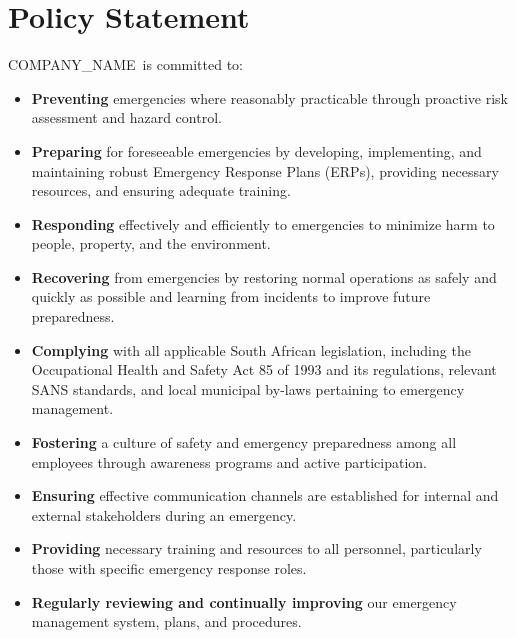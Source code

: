 \documentclass[11pt]{article}
\newcommand{\clientName}{{{COMPANY_NAME}}}
\begin{document}
\section{Policy Statement}
\clientName\ is committed to:
\begin{itemize}
    \item \textbf{Preventing} emergencies where reasonably practicable through proactive risk assessment and hazard control.
    \item \textbf{Preparing} for foreseeable emergencies by developing, implementing, and maintaining robust Emergency Response Plans (ERPs), providing necessary resources, and ensuring adequate training.
    \item \textbf{Responding} effectively and efficiently to emergencies to minimize harm to people, property, and the environment.
    \item \textbf{Recovering} from emergencies by restoring normal operations as safely and quickly as possible and learning from incidents to improve future preparedness.
    \item \textbf{Complying} with all applicable South African legislation, including the Occupational Health and Safety Act 85 of 1993 and its regulations, relevant SANS standards, and local municipal by-laws pertaining to emergency management.
    \item \textbf{Fostering} a culture of safety and emergency preparedness among all employees through awareness programs and active participation.
    \item \textbf{Ensuring} effective communication channels are established for internal and external stakeholders during an emergency.
    \item \textbf{Providing} necessary training and resources to all personnel, particularly those with specific emergency response roles.
    \item \textbf{Regularly reviewing and continually improving} our emergency management system, plans, and procedures.
\end{itemize}
\end{document}
